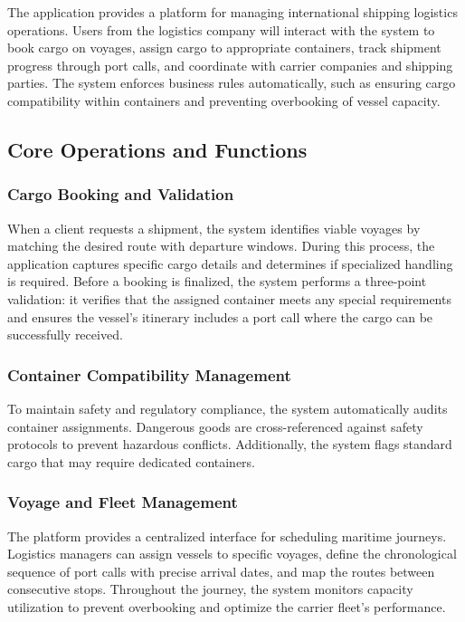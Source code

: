 \documentclass[11pt]{article}
\begin{document}
The application provides a platform for managing international shipping logistics operations. Users from the logistics company will interact with the system to book cargo on voyages, assign cargo to appropriate containers, track shipment progress through port calls, and coordinate with carrier companies and shipping parties. The system enforces business rules automatically, such as ensuring cargo compatibility within containers and preventing overbooking of vessel capacity.

\subsection{Core Operations and Functions}

\subsubsection{Cargo Booking and Validation}

When a client requests a shipment, the system identifies viable voyages by matching the desired route with departure windows. During this process, the application captures specific cargo details and determines if specialized handling is required. Before a booking is finalized, the system performs a three-point validation: it verifies that the assigned container meets any special requirements and ensures the vessel's itinerary includes a port call where the cargo can be successfully received.

\subsubsection{Container Compatibility Management}

To maintain safety and regulatory compliance, the system automatically audits container assignments. Dangerous goods are cross-referenced against safety protocols to prevent hazardous conflicts. Additionally, the system flags standard cargo that may require dedicated containers.

\subsubsection{Voyage and Fleet Management}

The platform provides a centralized interface for scheduling maritime journeys. Logistics managers can assign vessels to specific voyages, define the chronological sequence of port calls with precise arrival dates, and map the routes between consecutive stops. Throughout the journey, the system monitors capacity utilization to prevent overbooking and optimize the carrier fleet's performance.
\end{document}
